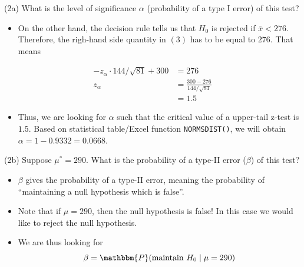 \documentclass[
  11pt,
  ignorenonframetext,
]{beamer}
\providecommand{\tightlist}{%
  \setlength{\itemsep}{0pt}\setlength{\parskip}{0pt}}
\begin{document}
\begin{frame}[fragile]{(2a) What is the level of significance \(\alpha\)
\qquad \qquad \qquad \qquad (probability of a type I error) of this
test?}
\protect\hypertarget{a-what-is-the-level-of-significance-alpha-probability-of-a-type-i-error-of-this-test-1}{}
\begin{itemize}
\tightlist
\item
  On the other hand, the decision rule tells us that \(H_0\) is rejected
  if \(\bar{x} < 276\). Therefore, the righ-hand side quantity in
  \((3)\) has to be equal to \(276\). That means
\end{itemize}

\[
\begin{aligned}
- z_\alpha\cdot 144/\sqrt{81} + 300 &= 276\\
z_\alpha &= \frac{300-276}{144/\sqrt{81}}\\
&= 1.5
\end{aligned}
\]

\begin{itemize}
\tightlist
\item
  Thus, we are looking for \(\alpha\) such that the critical value of a
  upper-tail z-test is \(1.5\). Based on statistical table/Excel
  function \texttt{NORMSDIST()}, we will obtain
  \(\alpha = 1 - 0.9332 = 0.0668\).
\end{itemize}
\end{frame}

\begin{frame}{(2b) Suppose \(\mu^* = 290\). \hspace{9cm} What is the
probability of a type-II error (\(\beta\)) of this test?}
\protect\hypertarget{b-suppose-mu-290.-what-is-the-probability-of-a-type-ii-error-beta-of-this-test}{}
\begin{itemize}
\item
  \(\beta\) gives the probability of a type-II error, meaning the
  probability of ``maintaining a null hypothesis which is false''.
\item
  Note that if \(\mu = 290\), then the null hypothesis is false! In this
  case we would like to reject the null hypothesis.
\item
  We are thus looking for \[
  \beta = \mathbbm{P}(\text{maintain } H_0 \mid \mu = 290)
  \]
\end{itemize}
\end{frame}
\end{document}
